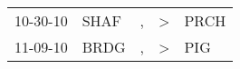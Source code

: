 \begin{supertabular}{lllll}
 10-30-10 &  SHAF &  , &  \textgreater &  PRCH \\
 11-09-10 &  BRDG &  , &  \textgreater &   PIG \\
\end{supertabular}
